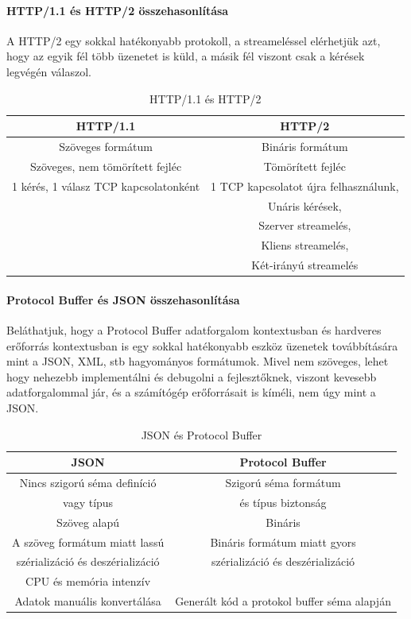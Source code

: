 \paragraph{HTTP/1.1 és HTTP/2 összehasonlítása}
A HTTP/2 egy sokkal hatékonyabb protokoll, a streameléssel elérhetjük azt, hogy az egyik fél több üzenetet is küld, a másik fél viszont csak a kérések legvégén válaszol.
\begin{table}[h]
    \centering
    \caption{HTTP/1.1 és HTTP/2}
    \label{tab:http}
    \begin{tabular}{|c|c|}
        \hline
        HTTP/1.1 & HTTP/2 \\
        \hline
        Szöveges formátum & Bináris formátum \\
        \hline
        Szöveges, nem tömörített fejléc & Tömörített fejléc \\
        \hline
        1 kérés, 1 válasz TCP kapcsolatonként & 1 TCP kapcsolatot újra felhasználunk,\\
        & Unáris kérések,\\
        & Szerver streamelés,\\
        & Kliens streamelés,\\
        & Két-irányú streamelés\\
        \hline
    \end{tabular}
\end{table}

\paragraph{Protocol Buffer és JSON összehasonlítása}

Beláthatjuk, hogy a Protocol Buffer adatforgalom kontextusban és hardveres erőforrás kontextusban is egy sokkal hatékonyabb eszköz üzenetek továbbítására mint a JSON, XML, stb hagyományos formátumok.
Mivel nem szöveges, lehet hogy nehezebb implementálni és debugolni a fejlesztőknek, viszont kevesebb adatforgalommal jár, és a számítógép erőforrásait is kíméli, nem úgy mint a JSON.

\begin{table}[h]
    \centering
    \caption{JSON és Protocol Buffer}
    \label{tab:message-exchange}
    \begin{tabular}{|c|c|}
        \hline
        JSON & Protocol Buffer \\
        \hline
        Nincs szigorú séma definíció & Szigorú séma formátum \\
        vagy típus & és típus biztonság \\
        \hline
        Szöveg alapú & Bináris \\
        \hline
        A szöveg formátum miatt lassú & Bináris formátum miatt gyors\\
        szérializáció és deszérializáció & szérializáció és deszérializáció\\
        CPU és memória intenzív & \\
        \hline
        Adatok manuális konvertálása & Generált kód a protokol buffer séma alapján\\
        \hline
    \end{tabular}
\end{table}

